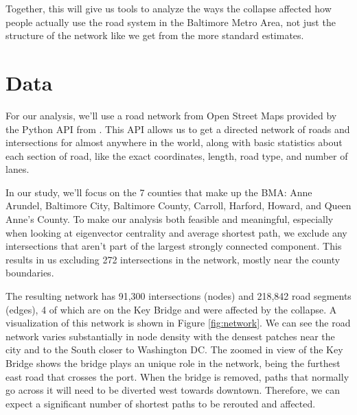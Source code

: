 \documentclass[11pt]{article}
\numberwithin{equation}{section} %
\numberwithin{figure}{section} %
\numberwithin{table}{section} %
\theoremstyle{definition}
\begin{document}
Together, this will give us tools to analyze the ways the collapse affected how people actually use the road system in the Baltimore Metro Area, not just the structure of the network like we get from the more standard estimates.


\section{Data} \label{sec:data}

For our analysis, we'll use a road network from Open Street Maps provided by the Python API from \cite{Boeing17}. This API allows us to get a directed network of roads and intersections for almost anywhere in the world, along with basic statistics about each section of road, like the exact coordinates, length, road type, and number of lanes. 

In our study, we'll focus on the 7 counties that make up the BMA: Anne Arundel, Baltimore City, Baltimore County, Carroll, Harford, Howard, and Queen Anne's County. To make our analysis both feasible and meaningful, especially when looking at eigenvector centrality and average shortest path, we exclude any intersections that aren't part of the largest strongly connected component. This results in us excluding 272 intersections in the network, mostly near the county boundaries.

The resulting network has 91,300 intersections (nodes) and 218,842 road segments (edges), 4 of which are on the Key Bridge and were affected by the collapse. A visualization of this network is shown in Figure \ref{fig:network}. We can see the road network varies substantially in node density with the densest patches near the city and to the South closer to Washington DC. The zoomed in view of the Key Bridge shows the bridge plays an unique role in the network, being the furthest east road that crosses the port. When the bridge is removed, paths that normally go across it will need to be diverted west towards downtown. Therefore, we can expect a significant number of shortest paths to be rerouted and affected.
\end{document}

